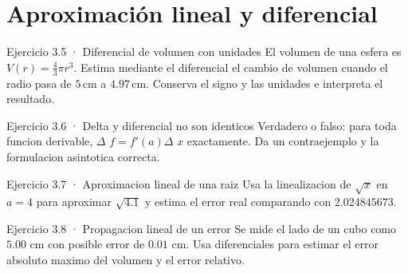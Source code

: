 \documentclass[10pt,a4paper,oneside,openany]{book}
\begin{document}
\section{Aproximación lineal y diferencial}
\begin{PSevenExerciseFixed}{Ejercicio 3.5 · Diferencial de volumen con unidades}
El volumen de una esfera es \(V(r)=\tfrac43\pi r^3\). Estima mediante el diferencial el cambio de volumen cuando el radio pasa de \(5\,\mathrm{cm}\) a \(4.97\,\mathrm{cm}\). Conserva el signo y las unidades e interpreta el resultado.
\end{PSevenExerciseFixed}
\begin{PSevenExerciseFixed}{Ejercicio 3.6 · Delta y diferencial no son identicos}
Verdadero o falso: para toda funcion derivable, \(\Delta \) \(f=f'(a)\Delta \) \(x\) exactamente. Da un contraejemplo y la formulacion asintotica correcta.
\end{PSevenExerciseFixed}
\begin{PSevenExerciseFixed}{Ejercicio 3.7 · Aproximacion lineal de una raiz}
Usa la linealizacion de \(\sqrt{x}\) en \(a=4\) para aproximar \(\sqrt{4.1}\) y estima el error real comparando con \(2.024845673\).
\end{PSevenExerciseFixed}
\begin{PSevenExerciseFixed}{Ejercicio 3.8 · Propagacion lineal de un error}
Se mide el lado de un cubo como \(5.00\) cm con posible error de \(0.01\) cm. Usa diferenciales para estimar el error absoluto maximo del volumen y el error relativo.
\end{PSevenExerciseFixed}
\end{document}
